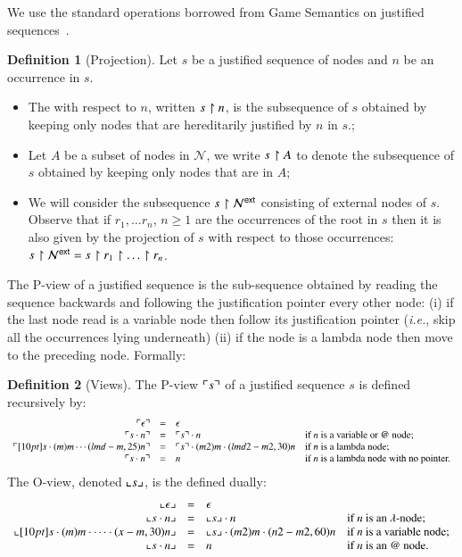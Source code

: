 \documentclass{elsarticle}
\makeatletter
\theoremstyle{plain}
\theoremstyle{definition}
\newtheorem{definition}{Definition}[section]
\theoremstyle{remark}
\newcommand\Nodes{\mathcal{N}}%
\newcommand{\ExtNodes}{\Nodes^{\sf ext}}
\renewcommand\ie{{\it i.e.\@\xspace}}
\makeatother
\begin{document}
We use the standard operations borrowed from Game Semantics on justified sequences~\cite{Abr02}.

\begin{definition}[Projection]
Let $s$ be a justified sequence of nodes and $n$ be an occurrence in $s$.

\begin{itemize}
\item The  with respect to $n$, written $s\upharpoonright n$, is the subsequence of $s$ obtained by keeping only nodes that are hereditarily justified by $n$ in $s$.;

 \item Let $A$ be a subset of nodes in $\Nodes$, we write $s \upharpoonright A$ to denote the subsequence of $s$ obtained by keeping only nodes that are in $A$;

 \item We will consider the subsequence $s\filter\ExtNodes$ consisting of external nodes of $s$. Observe that if $r_1, \ldots r_n$, $n\geq 1$ are the occurrences of the root in $s$ then it is also given by the projection of $s$ with respect to those occurrences: $s\filter\ExtNodes = s\filter r_1 \filter \ldots \filter r_n$.
\end{itemize}
\end{definition}

The P-view of a justified sequence is the sub-sequence obtained by reading the sequence backwards and following the justification pointer every other node: (i) if the last node read is a variable node then follow its justification pointer (\ie, skip all the occurrences lying underneath) (ii) if the node is a lambda node then move to the preceding node. Formally:
\begin{definition}[Views]
\label{def:views}
The P-view $\ulcorner s \urcorner$ of a justified sequence $s$ is defined recursively by:
$$\begin{array}{rcll}
 \pview{\epsilon} &=&  \epsilon \\
 \pview{s \cdot n }  &=&  \pview{s} \cdot n
    & \mbox{if $n$ is a variable or $@$ node;}
    \\
 \pview{\Pstr[10pt]{ s \cdot (m){m} \cdots (lmd-m,25){n}}} &=&
        \Pstr{ \pview{s} \cdot (m2){m} \cdot (lmd2-m2,30){n} }
    & \mbox{if $n$ is a lambda node;}
    \\
 \pview{s \cdot n }  &=&  n & \mbox{if $n$ is a lambda node with no pointer.}
\end{array}$$
The O-view, denoted $\llcorner s \lrcorner$, is the defined dually:
$$\begin{array}{rcll}
 \oview{\epsilon} &=&  \epsilon \\
 \oview{s \cdot n }  &=&  \oview{s} \cdot n
    & \mbox{if $n$ is an $\lambda$-node;}
    \\
 \oview{\Pstr[10pt]{s \cdot (m){m} \cdot \cdots \cdot (x-m,30){n}}} &=&
    \Pstr{ \oview{s} \cdot (m2){m} \cdot (n2-m2,60){n} }
    & \mbox{if $n$ is a variable node;}
    \\
 \oview{s \cdot n }  &=&  n
    & \mbox{if $n$ is an $@$ node.}
\end{array}$$
\end{definition}
\end{document}
